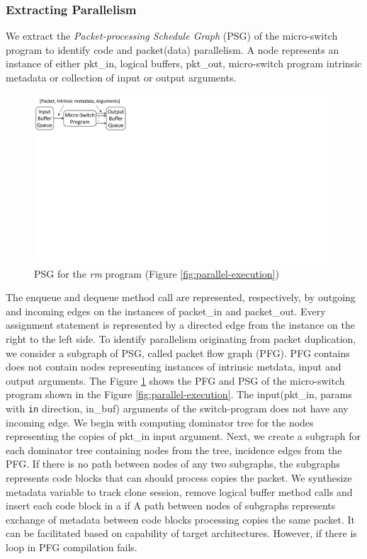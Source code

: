 \subsubsection{Extracting Parallelism}
We extract the \emph{Packet-processing Schedule Graph} (PSG) of the micro-switch program to identify code and packet(data) parallelism.
A node represents an instance of either pkt\_in, logical buffers, pkt\-\_out, micro-switch program intrinsic metadata or collection of input or output arguments.
\begin{figure}[!h]
    \centering
    \includegraphics[trim=0 420 667 0, clip, scale=0.5]{microp4-program-model}
    \caption{PSG for the \emph{rm} program (Figure \ref{fig:parallel-execution})}
    \label{fig:graph}
\end{figure}
The enqueue and dequeue method call are represented, respectively, by outgoing and incoming edges on the instances of packet\_in and packet\_out.
Every assignment statement is represented by a directed edge from the instance on the right to the left side.
To identify parallelism originating from packet duplication, we consider a subgraph of PSG, called packet flow graph (PFG).
PFG contains does not contain nodes representing instances of intrinsic metdata, input and output arguments.
The Figure \ref{fig:graph} shows the PFG and PSG of the micro-switch program shown in the Figure \ref{fig:parallel-execution}.
The input(pkt\_in, params with \texttt{in} direction, in\_buf) arguments of the switch-program does not have any incoming edge.
We begin with computing dominator tree for the nodes representing the copies of pkt\_in input argument.
Next, we create a subgraph for each dominator tree containing nodes from the tree, incidence edges from the PFG.
If there is no path between nodes of any two subgraphs, the subgraphs represents code blocks that can should process copies the packet.
We synthesize metadata variable to track clone session, remove logical buffer method calls and insert each code block in a if
A path between nodes of subgraphs represents exchange of metadata between code blocks processing copies the same packet.
It can be facilitated based on capability of target architectures.
However, if there is loop in PFG compilation fails.


